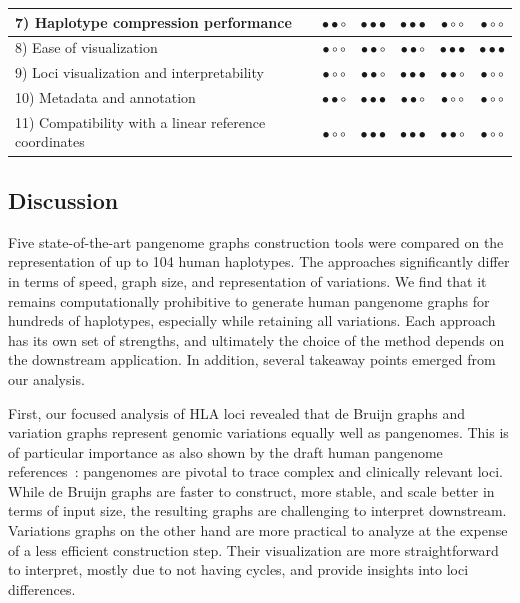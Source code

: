 \begin{table}
{\begin{tabular}{|l c c c c c|}
			\hline
			7) Haplotype compression performance & $\bullet\bullet\circ$ & $\bullet\bullet\bullet$ & $\bullet\bullet\bullet$ & $\bullet\circ\circ$ & $\bullet\circ\circ$\\
			\hline
			8) Ease of visualization  & $\bullet\circ\circ$ & $\bullet\bullet\circ$ & $\bullet\bullet\circ$ & $\bullet\bullet\bullet$ & $\bullet\bullet\bullet$ \\
			\hline
			9) Loci visualization and interpretability   & $\bullet\circ\circ$ & $\bullet\bullet\circ$& $\bullet\bullet\bullet$ & $\bullet\bullet\circ$  & $\bullet\circ\circ$\\
			\hline
			10) Metadata and annotation   & $\bullet\bullet\circ$ & $\bullet\bullet\bullet$ & $\bullet\bullet\circ$ & $\bullet\circ\circ$  & $\bullet\circ\circ$\\
			\hline
			11) Compatibility with a linear reference coordinates & $\bullet\circ\circ$ & $\bullet\bullet\bullet$ & $\bullet\bullet\bullet$ & $\bullet\bullet\circ$  & $\bullet\circ\circ$\\
			\hline
	\end{tabular}}
	\label{tab:tools_consideration}
\end{table}

\subsection{Discussion}
Five state-of-the-art pangenome graphs construction tools were compared on the representation of up to 104 human haplotypes. The approaches significantly differ in terms of speed, graph size, and representation of variations. We find that it remains computationally prohibitive to generate human pangenome graphs for hundreds of haplotypes, especially while retaining all variations. Each approach has its own set of strengths, and ultimately the choice of the method depends on the downstream application. In addition, several takeaway points emerged from our analysis.

First, our focused analysis of HLA loci revealed that de Bruijn graphs and variation graphs represent genomic variations equally well as pangenomes.  This is of particular importance as also shown by the draft human pangenome references~\mbox{\cite{hdpr}}: pangenomes are pivotal to trace complex and clinically relevant loci. While de Bruijn graphs are faster to construct, more stable, and scale better in terms of input size, the resulting graphs are challenging to interpret downstream. Variations graphs on the other hand are more practical to analyze at the expense of a less efficient construction step. Their visualization are more straightforward to interpret, mostly due to not having cycles, and provide insights into loci differences. 

